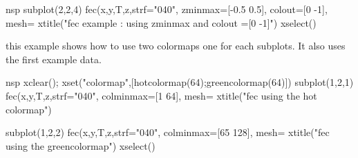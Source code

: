 \begin{examples}
\begin{mintednsp}{nsp}
subplot(2,2,4)
fec(x,y,T,z,strf="040", zminmax=[-0.5 0.5], colout=[0 -1], mesh=%
xtitle("fec example : using zminmax and colout =[0 -1]")
xselect()
\end{mintednsp}

\noindent this example shows how to use two colormaps one for each subplots. It
also uses the first example data.

\begin{mintednsp}{nsp}
xclear();
xset("colormap",[hotcolormap(64);greencolormap(64)])
subplot(1,2,1)
fec(x,y,T,z,strf="040", colminmax=[1 64], mesh=%
xtitle("fec using the hot colormap")

subplot(1,2,2)
fec(x,y,T,z,strf="040", colminmax=[65 128], mesh=%
xtitle("fec using the greencolormap")
xselect()
\end{mintednsp}
\end{examples}
  \begin{manseealso}
      
  \end{manseealso}
